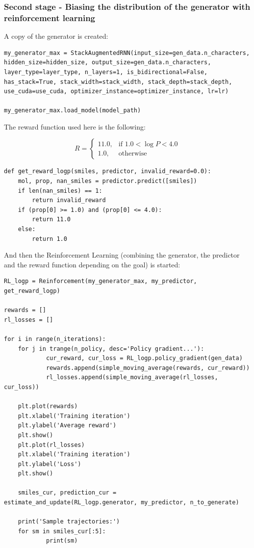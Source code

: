 \documentclass[a4paper]{article}
\begin{document}
\subsubsection{Second stage - Biasing the distribution of the generator with reinforcement learning}\label{sec:Second stage - Biasing the distribution of the generator with reinforcement learning}

A copy of the generator is created:

\begin{lstlisting}
my_generator_max = StackAugmentedRNN(input_size=gen_data.n_characters, hidden_size=hidden_size, output_size=gen_data.n_characters, layer_type=layer_type, n_layers=1, is_bidirectional=False, has_stack=True, stack_width=stack_width, stack_depth=stack_depth, use_cuda=use_cuda, optimizer_instance=optimizer_instance, lr=lr)

my_generator_max.load_model(model_path)
\end{lstlisting}

The reward function used here is the following:

$$
R =  \begin{cases} 11.0, & \mbox{if } 1.0 < \log P < 4.0 \\ 1.0, & \mbox{otherwise}  \end{cases}
$$

\begin{lstlisting}
def get_reward_logp(smiles, predictor, invalid_reward=0.0):
    mol, prop, nan_smiles = predictor.predict([smiles])
    if len(nan_smiles) == 1:
        return invalid_reward
    if (prop[0] >= 1.0) and (prop[0] <= 4.0):
        return 11.0
    else:
        return 1.0
\end{lstlisting}

And then the Reinforcement Learning (combining the generator, the predictor and the reward function depending on the goal) is started:

\begin{lstlisting}
RL_logp = Reinforcement(my_generator_max, my_predictor, get_reward_logp)

rewards = []
rl_losses = []

for i in range(n_iterations):
	for j in trange(n_policy, desc='Policy gradient...'):
			cur_reward, cur_loss = RL_logp.policy_gradient(gen_data)
			rewards.append(simple_moving_average(rewards, cur_reward)) 
			rl_losses.append(simple_moving_average(rl_losses, cur_loss))
	
	plt.plot(rewards)
	plt.xlabel('Training iteration')
	plt.ylabel('Average reward')
	plt.show()
	plt.plot(rl_losses)
	plt.xlabel('Training iteration')
	plt.ylabel('Loss')
	plt.show()
			
	smiles_cur, prediction_cur = estimate_and_update(RL_logp.generator, my_predictor, n_to_generate)
																									
	print('Sample trajectories:')
	for sm in smiles_cur[:5]:
			print(sm)
\end{lstlisting}
\end{document}
